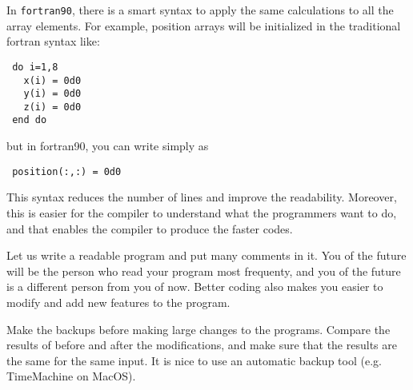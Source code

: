 \documentclass[a4,10pt]{article}
\begin{document}
In {\tt fortran90}, there is a smart syntax to apply the same calculations to all the array elements.  For example, position arrays will be initialized in the traditional fortran syntax like:
\begin{screen}\begin{verbatim}
 do i=1,8
   x(i) = 0d0
   y(i) = 0d0
   z(i) = 0d0
 end do
\end{verbatim}\end{screen}
but in fortran90, you can write simply as
\begin{screen}\begin{verbatim}
 position(:,:) = 0d0
\end{verbatim}\end{screen}

This syntax reduces the number of lines and improve the readability.  Moreover, this is easier for the compiler to understand what the programmers want to do, and that enables the compiler to produce the faster codes.

\begin{shadebox}
Let us write a readable program and put many comments in it.  You of the future will be the person who read your program most frequenty, and you of the future is a different person from you of now.  Better coding also makes you easier to modify and add new features to the program.  %
\end{shadebox} 

\begin{shadebox}
Make the backups before making large changes to the programs.  Compare the results of before and after the modifications, and make sure that the results are the same for the same input.  It is nice to use an automatic backup tool (e.g. TimeMachine on MacOS).
\end{shadebox}



\end{document}
